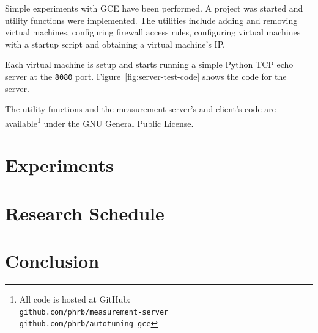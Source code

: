 \documentclass[a4paper, 12pt]{article}
\begin{document}
Simple experiments with GCE have been performed. A project
was started and utility functions were implemented.
The utilities include adding and removing virtual machines,
configuring firewall access rules, configuring virtual machines
with a startup script and obtaining a virtual machine's IP.

Each virtual machine is setup and starts running a simple
Python TCP echo server at the \texttt{\footnotesize 8080} 
port. Figure~\ref{fig:server-test-code} shows the code for the 
server.

The utility functions and the measurement server's and client's code
are available\footnote{All code is hosted at GitHub: \\
\texttt{\scriptsize github.com/phrb/measurement-server} \\
\texttt{\scriptsize github.com/phrb/autotuning-gce}}
under the GNU General Public License.



\section{Experiments} \label{sec:exp}

\section{Research Schedule} \label{sec:sched}

\section{Conclusion} \label{sec:conclusion}



\end{document}

